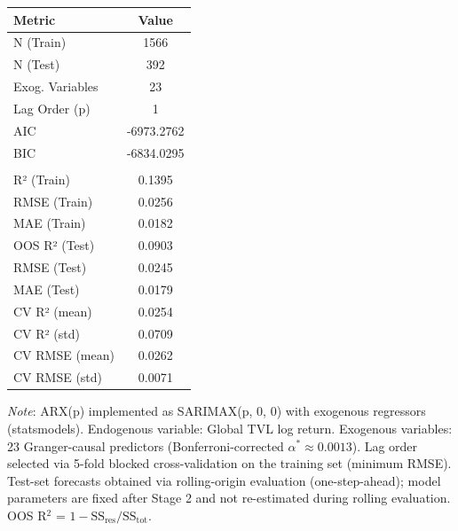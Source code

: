 \begin{tabular}{lc}
  \toprule
  \textbf{Metric} & \textbf{Value} \\ 
  \midrule
  N (Train) & 1566 \\ 
  N (Test) & 392 \\ 
  Exog. Variables & 23 \\ 
  Lag Order (p) & 1 \\ 
  AIC & -6973.2762 \\ 
  BIC & -6834.0295 \\ 
   &  \\ 
  R² (Train) & 0.1395 \\ 
  RMSE (Train) & 0.0256 \\ 
  MAE (Train) & 0.0182 \\ 
  OOS R² (Test) & 0.0903 \\ 
  RMSE (Test) & 0.0245 \\ 
  MAE (Test) & 0.0179 \\ 
  CV R² (mean) & 0.0254 \\ 
  CV R² (std) & 0.0709 \\ 
  CV RMSE (mean) & 0.0262 \\ 
  CV RMSE (std) & 0.0071 \\ 
  \bottomrule
\end{tabular}
\par\vspace{4pt}
\begin{minipage}{\linewidth}
  \footnotesize \textit{Note}: ARX(p) implemented as SARIMAX(p, 0, 0) with exogenous regressors (statsmodels). Endogenous variable: Global TVL log return. Exogenous variables: 23 Granger-causal predictors (Bonferroni-corrected $\alpha^* \approx 0.0013$). Lag order selected via 5-fold blocked cross-validation on the training set (minimum RMSE). Test-set forecasts obtained via rolling-origin evaluation (one-step-ahead); model parameters are fixed after Stage 2 and not re-estimated during rolling evaluation. OOS R$^2$ = $1 - \text{SS}_{\text{res}} / \text{SS}_{\text{tot}}$.
\end{minipage}